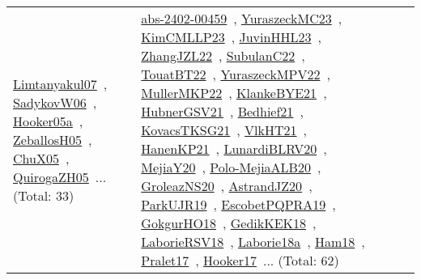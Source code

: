 {\begin{longtable}{lp{3cm}>{\raggedright\arraybackslash}p{6cm}>{\raggedright\arraybackslash}p{6cm}>{\raggedright\arraybackslash}p{8cm}}
\href{works/Limtanyakul07.pdf}{Limtanyakul07}~\cite{Limtanyakul07}, \href{works/SadykovW06.pdf}{SadykovW06}~\cite{SadykovW06}, \href{works/Hooker05a.pdf}{Hooker05a}~\cite{Hooker05a}, \href{works/ZeballosH05.pdf}{ZeballosH05}~\cite{ZeballosH05}, \href{works/ChuX05.pdf}{ChuX05}~\cite{ChuX05}, \href{works/QuirogaZH05.pdf}{QuirogaZH05}~\cite{QuirogaZH05}... (Total: 33) & \href{works/abs-2402-00459.pdf}{abs-2402-00459}~\cite{abs-2402-00459}, \href{works/YuraszeckMC23.pdf}{YuraszeckMC23}~\cite{YuraszeckMC23}, \href{works/KimCMLLP23.pdf}{KimCMLLP23}~\cite{KimCMLLP23}, \href{works/JuvinHHL23.pdf}{JuvinHHL23}~\cite{JuvinHHL23}, \href{works/ZhangJZL22.pdf}{ZhangJZL22}~\cite{ZhangJZL22}, \href{works/SubulanC22.pdf}{SubulanC22}~\cite{SubulanC22}, \href{works/TouatBT22.pdf}{TouatBT22}~\cite{TouatBT22}, \href{works/YuraszeckMPV22.pdf}{YuraszeckMPV22}~\cite{YuraszeckMPV22}, \href{works/MullerMKP22.pdf}{MullerMKP22}~\cite{MullerMKP22}, \href{works/KlankeBYE21.pdf}{KlankeBYE21}~\cite{KlankeBYE21}, \href{works/HubnerGSV21.pdf}{HubnerGSV21}~\cite{HubnerGSV21}, \href{works/Bedhief21.pdf}{Bedhief21}~\cite{Bedhief21}, \href{works/KovacsTKSG21.pdf}{KovacsTKSG21}~\cite{KovacsTKSG21}, \href{works/VlkHT21.pdf}{VlkHT21}~\cite{VlkHT21}, \href{works/HanenKP21.pdf}{HanenKP21}~\cite{HanenKP21}, \href{works/LunardiBLRV20.pdf}{LunardiBLRV20}~\cite{LunardiBLRV20}, \href{works/MejiaY20.pdf}{MejiaY20}~\cite{MejiaY20}, \href{works/Polo-MejiaALB20.pdf}{Polo-MejiaALB20}~\cite{Polo-MejiaALB20}, \href{works/GroleazNS20.pdf}{GroleazNS20}~\cite{GroleazNS20}, \href{works/AstrandJZ20.pdf}{AstrandJZ20}~\cite{AstrandJZ20}, \href{works/ParkUJR19.pdf}{ParkUJR19}~\cite{ParkUJR19}, \href{works/EscobetPQPRA19.pdf}{EscobetPQPRA19}~\cite{EscobetPQPRA19}, \href{works/GokgurHO18.pdf}{GokgurHO18}~\cite{GokgurHO18}, \href{works/GedikKEK18.pdf}{GedikKEK18}~\cite{GedikKEK18}, \href{works/LaborieRSV18.pdf}{LaborieRSV18}~\cite{LaborieRSV18}, \href{works/Laborie18a.pdf}{Laborie18a}~\cite{Laborie18a}, \href{works/Ham18.pdf}{Ham18}~\cite{Ham18}, \href{works/Pralet17.pdf}{Pralet17}~\cite{Pralet17}, \href{works/Hooker17.pdf}{Hooker17}~\cite{Hooker17}... (Total: 62)\\

\end{longtable}}
